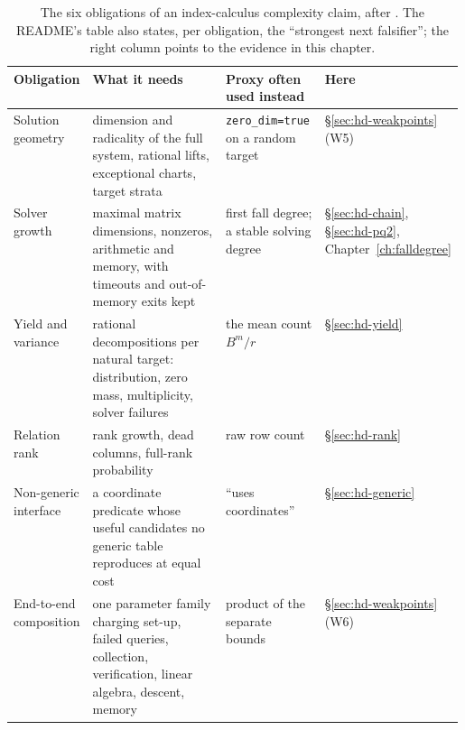 \begin{table}[tbp]
\centering\small
\begin{tabularx}{\linewidth}{@{}>{\raggedright\arraybackslash}p{0.16\linewidth}>{\raggedright\arraybackslash}X>{\raggedright\arraybackslash}p{0.22\linewidth}>{\raggedright\arraybackslash}p{0.2\linewidth}@{}}
\toprule
Obligation & What it needs & Proxy often used instead & Here \\
\midrule
Solution geometry & dimension and radicality of the full system, rational lifts, exceptional charts, target strata & \texttt{zero\_dim=true} on a random target & \S\ref{sec:hd-weakpoints} (W5) \\
\addlinespace
Solver growth & maximal matrix dimensions, nonzeros, arithmetic and memory, with timeouts and out-of-memory exits kept & first fall degree; a stable solving degree & \S\ref{sec:hd-chain}, \S\ref{sec:hd-pq2}, Chapter~\ref{ch:falldegree} \\
\addlinespace
Yield and variance & rational decompositions per natural target: distribution, zero mass, multiplicity, solver failures & the mean count $B^m/r$ & \S\ref{sec:hd-yield} \\
\addlinespace
Relation rank & rank growth, dead columns, full-rank probability & raw row count & \S\ref{sec:hd-rank} \\
\addlinespace
Non-generic interface & a coordinate predicate whose useful candidates no generic table reproduces at equal cost & ``uses coordinates'' & \S\ref{sec:hd-generic} \\
\addlinespace
End-to-end composition & one parameter family charging set-up, failed queries, collection, verification, linear algebra, descent, memory & product of the separate bounds & \S\ref{sec:hd-weakpoints} (W6) \\
\bottomrule
\end{tabularx}
\caption[]{The six obligations of an index-calculus complexity claim, after
. The README's table
also states, per obligation, the ``strongest next falsifier''; the right
column points to the evidence in this chapter.}
\label{tab:hd-chain}
\end{table}

